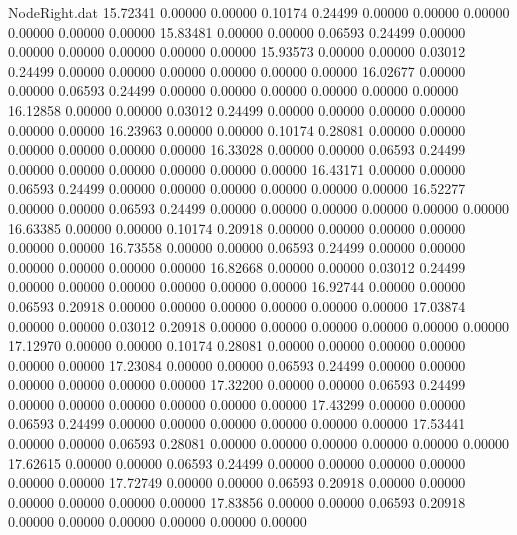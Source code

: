 \begin{filecontents}{NodeRight.dat}
  15.72341    0.00000    0.00000     0.10174    0.24499    0.00000    0.00000    0.00000    0.00000    0.00000    0.00000
  15.83481    0.00000    0.00000     0.06593    0.24499    0.00000    0.00000    0.00000    0.00000    0.00000    0.00000
  15.93573    0.00000    0.00000     0.03012    0.24499    0.00000    0.00000    0.00000    0.00000    0.00000    0.00000
  16.02677    0.00000    0.00000     0.06593    0.24499    0.00000    0.00000    0.00000    0.00000    0.00000    0.00000
  16.12858    0.00000    0.00000     0.03012    0.24499    0.00000    0.00000    0.00000    0.00000    0.00000    0.00000
  16.23963    0.00000    0.00000     0.10174    0.28081    0.00000    0.00000    0.00000    0.00000    0.00000    0.00000
  16.33028    0.00000    0.00000     0.06593    0.24499    0.00000    0.00000    0.00000    0.00000    0.00000    0.00000
  16.43171    0.00000    0.00000     0.06593    0.24499    0.00000    0.00000    0.00000    0.00000    0.00000    0.00000
  16.52277    0.00000    0.00000     0.06593    0.24499    0.00000    0.00000    0.00000    0.00000    0.00000    0.00000
  16.63385    0.00000    0.00000     0.10174    0.20918    0.00000    0.00000    0.00000    0.00000    0.00000    0.00000
  16.73558    0.00000    0.00000     0.06593    0.24499    0.00000    0.00000    0.00000    0.00000    0.00000    0.00000
  16.82668    0.00000    0.00000     0.03012    0.24499    0.00000    0.00000    0.00000    0.00000    0.00000    0.00000
  16.92744    0.00000    0.00000     0.06593    0.20918    0.00000    0.00000    0.00000    0.00000    0.00000    0.00000
  17.03874    0.00000    0.00000     0.03012    0.20918    0.00000    0.00000    0.00000    0.00000    0.00000    0.00000
  17.12970    0.00000    0.00000     0.10174    0.28081    0.00000    0.00000    0.00000    0.00000    0.00000    0.00000
  17.23084    0.00000    0.00000     0.06593    0.24499    0.00000    0.00000    0.00000    0.00000    0.00000    0.00000
  17.32200    0.00000    0.00000     0.06593    0.24499    0.00000    0.00000    0.00000    0.00000    0.00000    0.00000
  17.43299    0.00000    0.00000     0.06593    0.24499    0.00000    0.00000    0.00000    0.00000    0.00000    0.00000
  17.53441    0.00000    0.00000     0.06593    0.28081    0.00000    0.00000    0.00000    0.00000    0.00000    0.00000
  17.62615    0.00000    0.00000     0.06593    0.24499    0.00000    0.00000    0.00000    0.00000    0.00000    0.00000
  17.72749    0.00000    0.00000     0.06593    0.20918    0.00000    0.00000    0.00000    0.00000    0.00000    0.00000
  17.83856    0.00000    0.00000     0.06593    0.20918    0.00000    0.00000    0.00000    0.00000    0.00000    0.00000

\end{filecontents}
